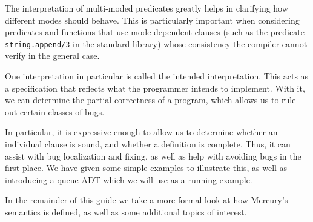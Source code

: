 The interpretation of multi-moded predicates
greatly helps in clarifying how different modes should behave.
This is particularly important when considering
predicates and functions that use mode-dependent clauses
(such as the predicate \texttt{string.append/3} in the standard library)
whose consistency the compiler cannot verify in the general case.

One interpretation in particular
is called the intended interpretation.
This acts as a specification
that reflects what the programmer intends to implement.
With it, we can determine the partial correctness of a program,
which allows us to rule out certain classes of bugs.

In particular,
it is expressive enough to allow us to determine
whether an individual clause is sound,
and whether a definition is complete.
Thus, it can assist with bug localization and fixing,
as well as help with avoiding bugs in the first place.
We have given some simple examples to illustrate this,
as well as introducing a queue ADT
which we will use as a running example.

In the remainder of this guide
we take a more formal look at
how Mercury's semantics is defined,
as well as some additional topics of interest.
